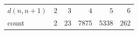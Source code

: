 \begin{tabular}{@{}lrrrrr@{}}
\toprule
$d(n,n+1)$ & $2$ & $3$ & $4$ & $5$ & $6$ \\
count & 2 & 23 & 7875 & 5338 & 262 \\
\bottomrule
\end{tabular}
